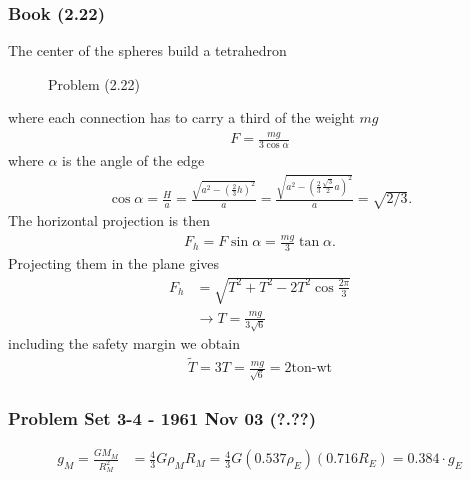 \documentclass[10pt,a4paper]{article}
\theoremstyle{definition}
\begin{document}
\subsubsection{Book (2.22)}
The center of the spheres build a tetrahedron
\begin{figure}[!h]
\centering
{}
\caption{Problem (2.22)}
\end{figure}
where each connection has to carry a third of the weight $mg$
\begin{align}
F=\frac{mg}{3\cos\alpha}
\end{align}
where $\alpha$ is the angle of the edge
\begin{align}
\cos\alpha=\frac{H}{a}=\frac{\sqrt{a^2-\left(\frac{2}{3}h\right)^2}}{a}=\frac{\sqrt{a^2-\left(\frac{2}{3}\frac{\sqrt{3}}{2}a\right)^2}}{a}=\sqrt{2/3}.
\end{align}
The horizontal projection is then
\begin{align}
F_h=F\sin\alpha=\frac{mg}{3}\tan\alpha.
\end{align}
Projecting them in the plane gives
\begin{align}
F_h&=\sqrt{T^2+T^2-2T^2\cos\frac{2\pi}{3}}\\
&\rightarrow T=\frac{mg}{3\sqrt{6}}
\end{align}
including the safety margin we obtain
\begin{align}
\widetilde{T}=3T=\frac{mg}{\sqrt{6}}=2\text{ton-wt}
\end{align}


\subsubsection{Problem Set 3-4 - 1961 Nov 03 (?.??)}
\begin{align}
    g_M=\frac{GM_M}{R_M^2}&=\frac{4}{3}G\rho_M R_M=\frac{4}{3}G (0.537\rho_E) (0.716R_E)=0.384 \cdot g_E
\end{align}
\end{document}

